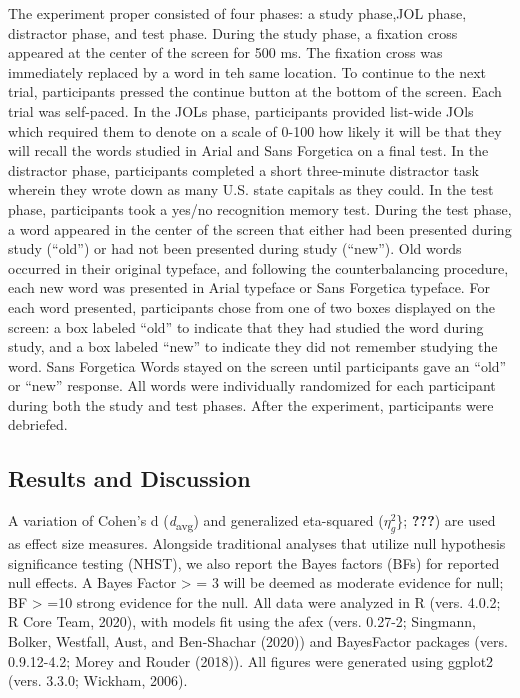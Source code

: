 \documentclass[
  english,
  jou]{apa6}
\begin{document}
The experiment proper consisted of four phases: a study phase,JOL phase, distractor phase, and test phase. During the study phase, a fixation cross appeared at the center of the screen for 500 ms. The fixation cross was immediately replaced by a word in teh same location. To continue to the next trial, participants pressed the continue button at the bottom of the screen. Each trial was self-paced. In the JOLs phase, participants provided list-wide JOls which required them to denote on a scale of 0-100 how likely it will be that they will recall the words studied in Arial and Sans Forgetica on a final test. In the distractor phase, participants completed a short three-minute distractor task wherein they wrote down as many U.S. state capitals as they could. In the test phase, participants took a yes/no recognition memory test. During the test phase, a word appeared in the center of the screen that either had been presented during study (\enquote{old}) or had not been presented during study (\enquote{new}). Old words occurred in their original typeface, and following the counterbalancing procedure, each new word was presented in Arial typeface or Sans Forgetica typeface. For each word presented, participants chose from one of two boxes displayed on the screen: a box labeled \enquote{old} to indicate that they had studied the word during study, and a box labeled \enquote{new} to indicate they did not remember studying the word. Sans Forgetica Words stayed on the screen until participants gave an \enquote{old} or \enquote{new} response. All words were individually randomized for each participant during both the study and test phases. After the experiment, participants were debriefed.

\hypertarget{results-and-discussion}{%
\subsection{Results and Discussion}\label{results-and-discussion}}

A variation of Cohen's d (\emph{d}\textsubscript{avg}) and generalized eta-squared (\(\eta_{g}^{2}\)\}; {\textbf{???}}) are used as effect size measures. Alongside traditional analyses that utilize null hypothesis significance testing (NHST), we also report the Bayes factors (BFs) for reported null effects. A Bayes Factor \textgreater{} = 3 will be deemed as moderate evidence for null; BF \textgreater{} =10 strong evidence for the null. All data were analyzed in R (vers. 4.0.2; R Core Team, 2020), with models fit using the afex (vers. 0.27-2; Singmann, Bolker, Westfall, Aust, and Ben-Shachar (2020)) and BayesFactor packages (vers. 0.9.12-4.2; Morey and Rouder (2018)). All figures were generated using ggplot2 (vers. 3.3.0; Wickham, 2006).
\end{document}
